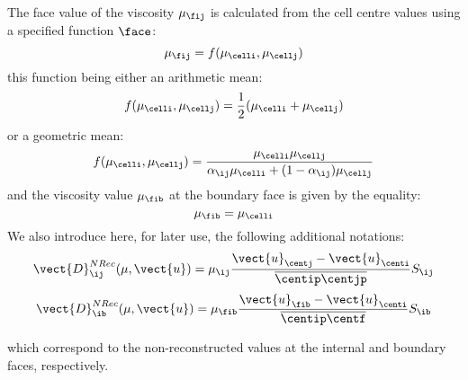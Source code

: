 The face value of the viscosity $\mu_{\fij}$ is calculated from the cell centre
values using a specified function $\face$:
\begin{equation*}
\mu_{\fij} = f(\mu_\celli,\mu_\cellj)
\end{equation*}
this function being either an arithmetic mean:
\begin{equation}
f(\mu_\celli,\mu_\cellj)= \frac{1}{2}(\mu_\celli+\mu_\cellj)
\end{equation}
or a geometric mean:
\begin{equation}
f(\mu_\celli,\mu_\cellj) = \dfrac{\mu_\celli \mu_\cellj}{\alpha_{\ij}
\mu_\celli+(1-\alpha_{\ij}) \mu_\cellj}
\end{equation}
and the viscosity value  $\mu_{\fib}$ at the boundary face is given by the equality:
\begin{equation}
\mu_{\fib}=\mu_\celli
\end{equation}
We also introduce here, for later use, the following additional notations:
\begin{equation}
\vect{D}^{NRec}_{\ij}(\mu, \vect{u}) = \mu_{\ij}
\dfrac{\vect{u}_{\centj}-\vect{u}_{\centi}}{\overline{\centip \centjp}} S_{\ij}
\end{equation}
\begin{equation}
\vect{D}^{NRec}_{\ib}(\mu, \vect{u}) = \mu_{\fib}
\dfrac{\vect{u}_{\fib}-\vect{u}_{\centi}}{\overline{\centip \centf}} S_{\ib}
\end{equation}

which correspond to the non-reconstructed values at the internal and boundary
faces, respectively.

